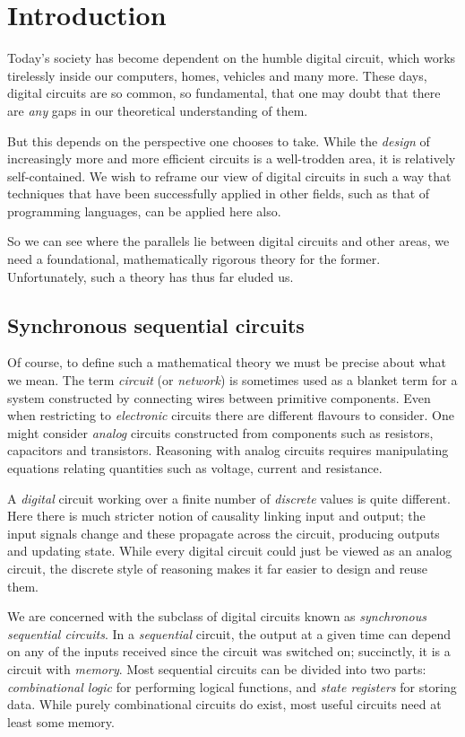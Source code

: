\chapter{Introduction}

Today's society has become dependent on the humble digital circuit, which works
tirelessly inside our computers, homes, vehicles and many more.
These days, digital circuits are so common, so fundamental, that one may doubt
that there are \emph{any} gaps in our theoretical understanding of them.

But this depends on the perspective one chooses to take.
While the \emph{design} of increasingly more and more efficient circuits is a
well-trodden area, it is relatively self-contained.
We wish to reframe our view of digital circuits in such a way that techniques
that have been successfully applied in other fields, such as that of programming
languages, can be applied here also.

So we can see where the parallels lie between digital circuits and other areas,
we need a foundational, mathematically rigorous theory for the former.
Unfortunately, such a theory has thus far eluded us.

\section{Synchronous sequential circuits}

Of course, to define such a mathematical theory we must be precise about what
we mean.
The term \emph{circuit} (or \emph{network}) is sometimes used as a blanket term
for a system constructed by connecting wires between primitive components.
Even when restricting to \emph{electronic} circuits there are different flavours
to consider.
One might consider \emph{analog} circuits constructed from components such as
resistors, capacitors and transistors.
Reasoning with analog circuits requires manipulating equations relating
quantities such as voltage, current and resistance.

A \emph{digital} circuit working over a finite number of \emph{discrete}
values is quite different.
Here there is much stricter notion of causality linking input and output; the
input signals change and these propagate across the circuit, producing outputs
and updating state.
While every digital circuit could just be viewed as an analog circuit, the
discrete style of reasoning makes it far easier to design and reuse them.

We are concerned with the subclass of digital circuits known as
\emph{synchronous sequential circuits}.
In a \emph{sequential} circuit, the output at a given time can depend on any of
the inputs received since the circuit was switched on; succinctly, it is a
circuit with \emph{memory}.
Most sequential circuits can be divided into two parts:
\emph{combinational logic} for performing logical functions, and
\emph{state registers} for storing data.
While purely combinational circuits do exist, most useful circuits need
at least some memory.

